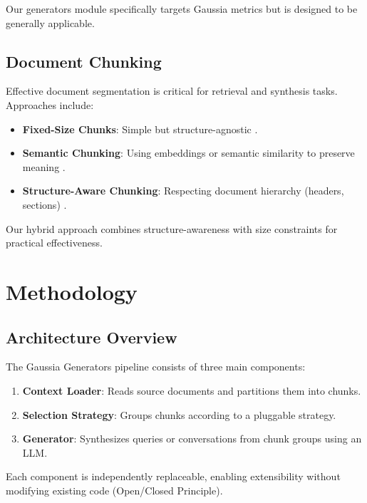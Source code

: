 \documentclass[11pt,a4paper]{article}
\begin{document}
Our generators module specifically targets Gaussia metrics but is designed to be generally applicable.

\subsection{Document Chunking}

Effective document segmentation is critical for retrieval and synthesis tasks. Approaches include:

\begin{itemize}
    \item \textbf{Fixed-Size Chunks}: Simple but structure-agnostic \cite{lewis2019retrieval}.

    \item \textbf{Semantic Chunking}: Using embeddings or semantic similarity to preserve meaning \cite{chen2023llamaindex}.

    \item \textbf{Structure-Aware Chunking}: Respecting document hierarchy (headers, sections) \cite{zhong2022structured}.
\end{itemize}

Our hybrid approach combines structure-awareness with size constraints for practical effectiveness.

\section{Methodology}

\subsection{Architecture Overview}

The Gaussia Generators pipeline consists of three main components:

\begin{enumerate}
    \item \textbf{Context Loader}: Reads source documents and partitions them into chunks.
    \item \textbf{Selection Strategy}: Groups chunks according to a pluggable strategy.
    \item \textbf{Generator}: Synthesizes queries or conversations from chunk groups using an LLM.
\end{enumerate}

Each component is independently replaceable, enabling extensibility without modifying existing code (Open/Closed Principle).
\end{document}
